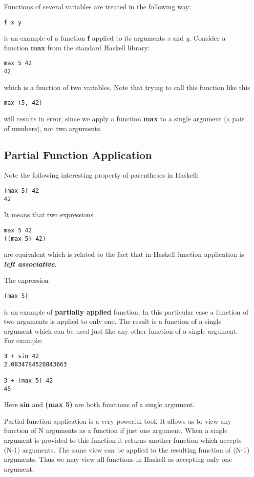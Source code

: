 \documentclass[11pt]{article}
\begin{document}
Functions of several variables are treated in the following way:
\begin{verbatim}
f x y
\end{verbatim}
is an example of a function \textbf{f} applied to its arguments \emph{x} and
\emph{y}. Consider a function \textbf{max} from the standard Haskell library:
\begin{verbatim}
max 5 42
42
\end{verbatim}
which is a function of two variables. Note that trying to call this
function like this
\begin{verbatim}
max (5, 42)
\end{verbatim}
will results in error, since we apply a function \textbf{max} to a single
argument (a pair of numbers), not two arguments.

\subsection{Partial Function Application}
\label{sec:orgcdac633}
Note the following interesting property of parentheses in Haskell:
\begin{verbatim}
(max 5) 42
42
\end{verbatim}
It means that two expressions
\begin{verbatim}
max 5 42
((max 5) 42)
\end{verbatim}
are equivalent which is related to the fact that in Haskell function
application is \textbf{\emph{left associative}}.

The expression
\begin{verbatim}
(max 5)
\end{verbatim}
is an example of \textbf{partially applied} function. In this particular case
a function of two arguments is applied to only one. The result is a
function of a single argument which can be used just like any other
function of a single argument. For example:
\begin{verbatim}
3 + sin 42
2.0834784520843663

3 + (max 5) 42
45
\end{verbatim}
Here \textbf{sin} and \textbf{(max 5)} are both functions of a single argument.

Partial function application is a very powerful tool. It allows us to
view any function of N arguments as a function if just one
argument. When a single argument is provided to this function it
returns another function which accepts (N-1) arguments. The same view
can be applied to the resulting function of (N-1) arguments. Thus
we may view all functions in Haskell as accepting only one argument.
\end{document}
